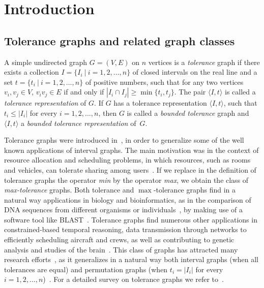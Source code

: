 \documentclass[proceedings]{stacs}
\begin{document}
\section{Introduction\label{sec:intro}}

\subsection{Tolerance graphs and related graph classes\label{classes}}

A simple undirected graph ${G=(V,E)}$ on $n$ vertices is a \emph{tolerance}
graph if there exists a collection ${I=\{I_{i}\ |\ i=1,2,\ldots ,n\}}$ of
closed intervals on the real line and a set ${t=\{t_{i}\ |\ i=1,2,\ldots ,n\}}$
of positive numbers, such that for any two vertices ${v_{i},v_{j}\in V}$, 
${v_{i}v_{j}\in E}$ if and only if ${|I_{i}\cap I_{j}|\geq \min \{t_{i},t_{j}\}}$. 
The pair ${\langle I,t\rangle}$ is called a \emph{tolerance representation}
of $G$. If $G$ has a tolerance representation ${\langle I,t\rangle}$, such
that ${t_{i}\leq |I_{i}|}$ for every $i=1,2,\ldots ,n$, then $G$ is called a 
\emph{bounded tolerance} graph and ${\langle I,t\rangle}$ a \emph{bounded
tolerance representation} of~$G$.

Tolerance graphs were introduced in~\cite{GoMo82}, in order to generalize
some of the well known applications of interval graphs. The main motivation
was in the context of resource allocation and scheduling problems, in which
resources, such as rooms and vehicles, can tolerate sharing among users~\cite%
{GolTol04}. If we replace in the definition of tolerance graphs the operator 
\emph{min} by the operator \emph{max}, we obtain the class of \emph{%
max-tolerance} graphs. Both tolerance and $\max $-tolerance graphs find in a
natural way applications in biology and bioinformatics, as in the comparison
of DNA sequences from different organisms or individuals~\cite{KKL+06}, by
making use of a software tool like BLAST~\cite{Altschul90}. Tolerance graphs
find numerous other applications in constrained-based temporal reasoning,
data transmission through networks to efficiently scheduling aircraft and
crews, as well as contributing to genetic analysis and studies of the 
brain~\cite{GolSi02,GolTol04}. This class of graphs has attracted many research 
efforts~\cite{GolTol04,GolumbicMonma84,GolSi02,HaSh04,Fel98,Bus06,KeBe04,BFI95,NaMa92,MSZ-Model-SIDMA-09}, 
as it generalizes in a natural way both interval graphs (when all
tolerances are equal) and permutation graphs (when $t_{i}=|I_{i}|$ for every 
$i=1,2,\ldots ,n$)~\cite{GoMo82}. For a detailed survey on tolerance graphs
we refer to~\cite{GolTol04}.
\end{document}
